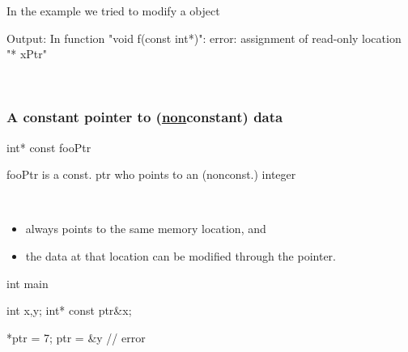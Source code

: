 \noindent In the example we tried to modify a  object\\
\begin{minipage}{\MPWxSxLISTING\textwidth} %
    \begin{Terminal}
Output:
In function "void f(const int*)":
error: assignment of read-only location "* xPtr"
    \end{Terminal}
\end{minipage}\\

\subsubsection{A constant pointer to (\underline{non}constant) data}
    \begin{minipage}{\MPWxXXXSxLISTING\textwidth} %
    \begin{CPPCode}
int* const fooPtr
    \end{CPPCode}
    \end{minipage}
\begin{minipage}{\MPWxSMALLxLISTING\textwidth} %
    \begin{Terminal}
fooPtr is a const. ptr who points to an (nonconst.) integer
    \end{Terminal}
    \end{minipage}\\
\begin{itemize}
    \item always points to the same memory location, and
    \item the data at that location can be modified through the pointer.
\end{itemize}
\begin{minipage}{\MPWxXSxLISTING\textwidth} %
    \begin{CPPCode}
int main
{
    int x,y;
    int* const ptr{&x};
    
    *ptr = 7;
    ptr = &y    // error     
}
    \end{CPPCode}
\end{minipage}
\\

